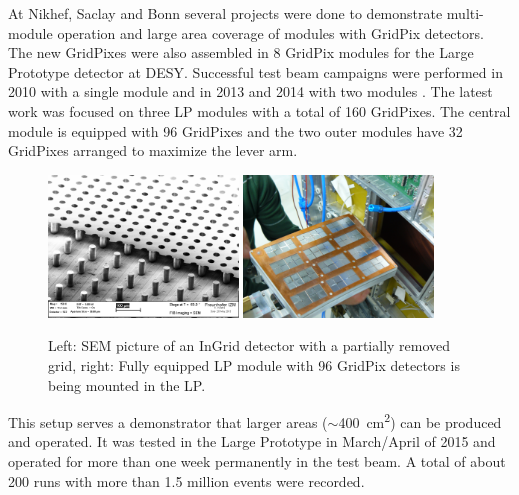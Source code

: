 At Nikhef, Saclay and Bonn several projects were done to demonstrate
multi-module operation and large area coverage of modules with GridPix
detectors. The new GridPixes were also assembled in 8
GridPix modules for the Large Prototype detector at DESY. Successful test beam
campaigns were performed in 2010 with a single module and in 2013 and 2014
with two modules
\cite{TPC_pixel_1LPmodule}. The latest work was focused on three LP modules
with a total of 160 GridPixes. The central module is equipped with 96
GridPixes and the two outer modules have 32 GridPixes arranged to maximize the
lever arm.
\begin{figure}[!t]
  \centering
  \includegraphics[width=0.45\textwidth]{plots/TPC_pixels_GridPix.png}
  \includegraphics[width=0.45\textwidth]{plots/TPC_pixel_complete_module.png}
  \caption{Left: SEM picture of an InGrid detector with a partially removed
    grid, right: Fully equipped LP module with 96 GridPix detectors is being
    mounted in the LP.}
  \label{fig_TPC_pixels_1}
\end{figure}

This setup serves a demonstrator that larger areas ($\sim$\SI{400}{\centi\meter\squared}) can be produced and operated. It was tested in the Large Prototype in
March/April of 2015 and operated for more than one week permanently in the
test beam. A total of about 200 runs with more than 1.5 million events were recorded.

